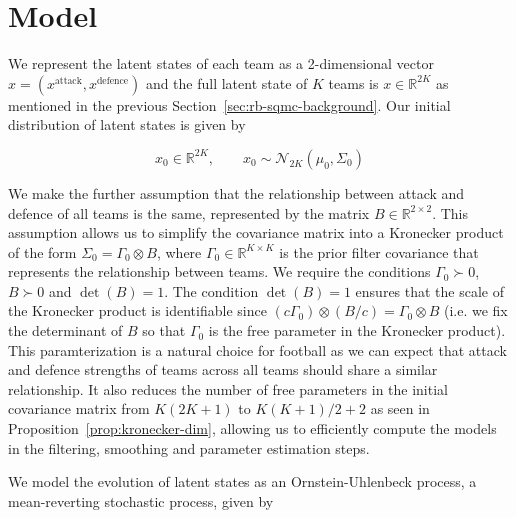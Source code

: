 \section{Model}
\label{sec:model}
We represent the latent states of each team as a 2-dimensional vector $x = (x^{\text{attack}}, x^{\text{defence}})$ and the full latent state of $K$ teams is $x \in \mathbb{R}^{2K}$ as mentioned in the previous Section~\ref{sec:rb-sqmc-background}. Our initial distribution of latent states is given by 

\begin{equation}
    x_0 \in \mathbb{R}^{2K}, \qquad x_0 \sim \mathcal{N}_{2K}(\mu_0, \Sigma_0)
\end{equation}

We make the further assumption that the relationship between attack and defence of all teams is the same, represented by the matrix $B \in \mathbb{R}^{2 \times 2}$. This assumption allows us to simplify the covariance matrix into a Kronecker product of the form $\Sigma_0 = \Gamma_0 \otimes B$, where $\Gamma_0 \in \mathbb{R}^{K \times K}$ is the prior filter covariance that represents the relationship between teams. We require the conditions $\Gamma_0 \succ 0$, $B \succ 0$ and $\det(B) = 1$. The condition $\det(B) = 1$ ensures that the scale of the Kronecker product is identifiable since $(c\Gamma_0) \otimes (B/c) = \Gamma_0 \otimes B$ (i.e. we fix the determinant of $B$ so that $\Gamma_0$ is the free parameter in the Kronecker product). This paramterization is a natural choice for football as we can expect that attack and defence strengths of teams across all teams should share a similar relationship. It also reduces the number of free parameters in the initial covariance matrix from $K(2K+1)$ to $K(K+1)/2 + 2$ as seen in Proposition~\ref{prop:kronecker-dim}, allowing us to efficiently compute the models in the filtering, smoothing and parameter estimation steps. 


We model the evolution of latent states as an Ornstein-Uhlenbeck process, a mean-reverting stochastic process, given by

